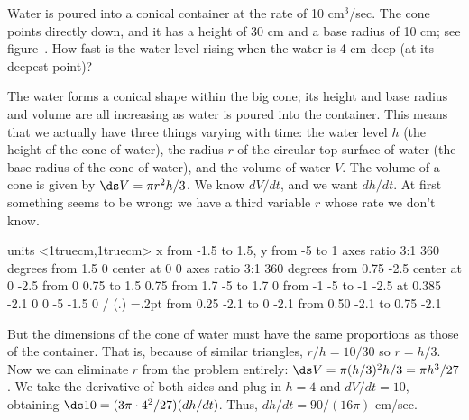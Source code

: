 \begin{example} Water is poured into a conical container at the rate of 10
cm${}^3$/sec.  The cone points directly down, and it has a height of
30 cm and a base radius of 10 cm; see figure~.
How fast is the water level rising when the water is 4 cm deep (at its
deepest point)?

The water forms a conical shape within the big cone; its
height and base radius and volume are all increasing
as water is poured into the container.  This means that we actually have
three things varying with time: the water level $h$ (the height of the cone
of water), the radius $r$ of the circular top surface of water (the base
radius of the cone of water), and the volume of water $V$.  
The volume of a cone is given by
$\ds V=\pi r^2h/3$.  We know $dV/dt$, and we want $dh/dt$.  At
first something seems to be wrong: we have a third variable $r$ whose rate
we don't know.  

\figure
\vbox{\beginpicture
\normalgraphs
\sevenpoint
\setcoordinatesystem units <1truecm,1truecm>
\setplotarea x from -1.5 to 1.5, y from -5 to 1
\ellipticalarc  axes ratio 3:1  360 degrees from 1.5 0 center at 0 0
\ellipticalarc  axes ratio 3:1  360 degrees from 0.75 -2.5 center at 0 -2.5
 from 0 0.75 to 1.5 0.75
 from 1.7 -5 to 1.7 0
 from -1 -5 to -1 -2.5
 at 0.385 -2.1
\setlinear
{} 0 0 -5 -1.5 0 /
\setplotsymbol ({\teeny.})
\plotsymbolspacing=.2pt
\arrow <2pt> [0.7, 2] from 0.25 -2.1 to 0 -2.1
\arrow <2pt> [0.7, 2] from 0.50 -2.1 to 0.75 -2.1
\endpicture}

But the dimensions of the cone of water must have the same
proportions as those of the container.  
That is, because of similar triangles, 
$r/h=10/30$ so $r=h/3$.  Now we can eliminate $r$ from the
problem entirely: $\ds V=\pi(h/3)^2h/3=\pi h^3/27$.  We take
the derivative of both sides and plug in $h=4$ and $dV/dt=10$, obtaining
$\ds 10=(3\pi\cdot 4^2/27)(dh/dt)$.  Thus, $dh/dt=90/(16\pi)$
cm/sec.
\end{example}

